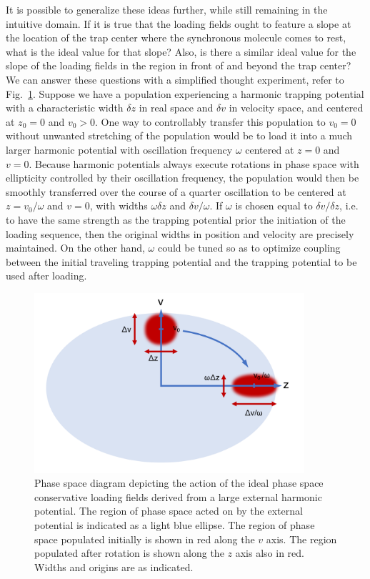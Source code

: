 \documentclass[defaultstyle,11pt]{thesis}
\begin{document}
It is possible to generalize these ideas further, while still remaining in the intuitive domain.
If it is true that the loading fields ought to feature a slope at the location of the trap center where the synchronous molecule comes to rest, what is the ideal value for that slope?
Also, is there a similar ideal value for the slope of the loading fields in the region in front of and beyond the trap center?
We can answer these questions with a simplified thought experiment, refer to Fig.~\ref{LoadingRotation}.
Suppose we have a population experiencing a harmonic trapping potential with a characteristic width $\delta z$ in real space and $\delta v$ in velocity space, and centered at $z_0=0$ and $v_0 > 0$.
One way to controllably transfer this population to $v_0=0$ without unwanted stretching of the population would be to load it into a much larger harmonic potential with oscillation frequency $\omega$ centered at $z=0$ and $v=0$.
Because harmonic potentials always execute rotations in phase space with ellipticity controlled by their oscillation frequency, the population would then be smoothly transferred over the course of a quarter oscillation to be centered at $z = v_0/\omega$ and $v=0$, with widths $\omega\delta z$ and $\delta v/\omega$.
If $\omega$ is chosen equal to $\delta v/\delta z$, i.e. to have the same strength as the trapping potential prior the initiation of the loading sequence, then the original widths in position and velocity are precisely maintained.
On the other hand, $\omega$ could be tuned so as to optimize coupling between the initial traveling trapping potential and the trapping potential to be used after loading.

\begin{figure}[t!]
\centering
\includegraphics[width=10cm]{LoadingRotation.png}
\caption[Ideal Trap Loading as a Quarter Rotation]{\label{LoadingRotation}
Phase space diagram depicting the action of the ideal phase space conservative loading fields derived from a large external harmonic potential. The region of phase space acted on by the external potential is indicated as a light blue ellipse. The region of phase space populated initially is shown in red along the $v$ axis. The region populated after rotation is shown along the $z$ axis also in red. Widths and origins are as indicated.
}
\end{figure}
\end{document}
